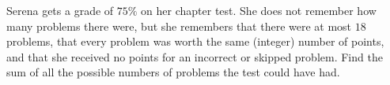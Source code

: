 Serena gets a grade of $75\%$ on her chapter test. She does not remember how many problems there were, but she remembers that there were at most $18$ problems, that every problem was worth the same (integer) number of points, and that she received no points for an incorrect or skipped problem. Find the sum of all the possible numbers of problems the test could have had.
